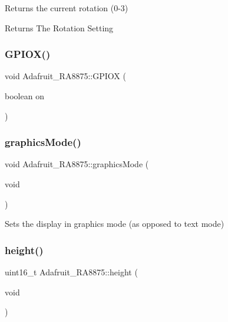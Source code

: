 Returns the current rotation (0-\/3)

\begin{DoxyReturn}{Returns}
The Rotation Setting 
\end{DoxyReturn}
\mbox{\label{class_adafruit___r_a8875_a01818bca3c07064255d7d1dda0feac10}} 
\subsubsection{\texorpdfstring{GPIOX()}{GPIOX()}}
{\footnotesize\ttfamily void Adafruit\+\_\+\+R\+A8875\+::\+G\+P\+I\+OX (\begin{DoxyParamCaption}\item[{boolean}]{on }\end{DoxyParamCaption})}

\mbox{\label{class_adafruit___r_a8875_a214eb74511139c5a0cdb62b051655f8a}} 
\subsubsection{\texorpdfstring{graphicsMode()}{graphicsMode()}}
{\footnotesize\ttfamily void Adafruit\+\_\+\+R\+A8875\+::graphics\+Mode (\begin{DoxyParamCaption}\item[{void}]{ }\end{DoxyParamCaption})}

Sets the display in graphics mode (as opposed to text mode) \mbox{\label{class_adafruit___r_a8875_a9f694201aec288b75ace7751b5a9f458}} 
\subsubsection{\texorpdfstring{height()}{height()}}
{\footnotesize\ttfamily uint16\+\_\+t Adafruit\+\_\+\+R\+A8875\+::height (\begin{DoxyParamCaption}\item[{void}]{ }\end{DoxyParamCaption})}

